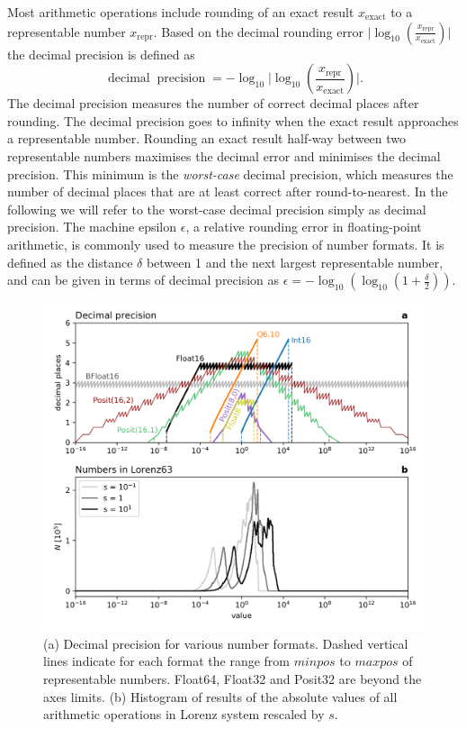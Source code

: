 \documentclass[draft]{agujournal2019}
\newcommand{\op}{\operatorname}
\begin{document}
Most arithmetic operations include rounding of an exact result $x_\text{exact}$
to a representable number $x_\text{repr}$. Based on the decimal rounding error
$\vert \log_{10}( \tfrac{x_\text{repr}}{x_\text{exact}} ) \vert$ the decimal precision
is defined as \cite{Gustafson2017, Klower2019c}
\begin{equation}
\op{decimal} \op{precision} = -\log_{10} \vert \log_{10}( \frac{x_\text{repr}}{x_\text{exact}} ) \vert.
\end{equation}
The decimal precision measures the number of correct decimal places after rounding.
The decimal precision goes to infinity when the exact result approaches a
representable number. Rounding an exact result half-way between two representable
numbers maximises the decimal error and minimises the decimal precision.
This minimum is the \emph{worst-case} decimal precision, which measures the number
of decimal places that are at least correct after round-to-nearest. In the following
we will refer to the worst-case decimal precision simply as decimal precision.
The machine epsilon $\epsilon$, a relative rounding error in floating-point arithmetic,
is commonly used to measure the precision of number formats. It is defined as the
distance $\delta$ between 1 and the next largest representable number, and can be
given in terms of decimal precision as $\epsilon = -\log_{10} ( \log_{10}( 1 + \tfrac{\delta}{2} ))$.

\begin{figure}[htbp]
\includegraphics[width=1\textwidth]{decimal_precision.png}
\caption{(a) Decimal precision for various number formats. Dashed vertical lines
indicate for each format the range from $minpos$ to $maxpos$ of representable numbers.
Float64, Float32 and Posit32 are beyond the axes limits. (b) Histogram of results
of the absolute values of all arithmetic operations in Lorenz system rescaled by $s$.}
\label{fig:dec_prec}
\end{figure}
\end{document}
